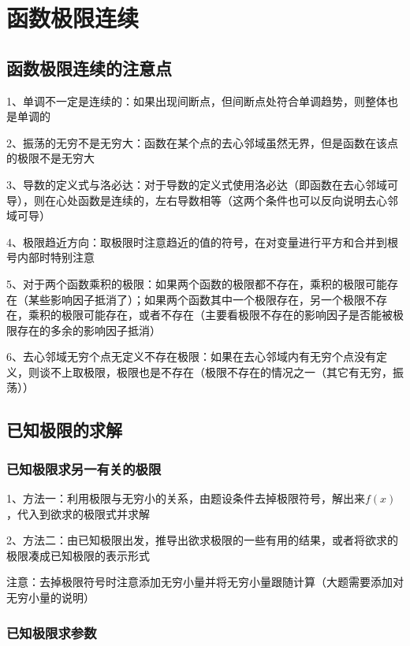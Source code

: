 \chapter{函数极限连续}

\section{函数极限连续的注意点}

1、单调不一定是连续的：如果出现间断点，但间断点处符合单调趋势，则整体也是单调的

2、振荡的无穷不是无穷大：函数在某个点的去心邻域虽然无界，但是函数在该点的极限不是无穷大

3、导数的定义式与洛必达：对于导数的定义式使用洛必达（即函数在去心邻域可导），则在心处函数是连续的，左右导数相等（这两个条件也可以反向说明去心邻域可导）

4、极限趋近方向：取极限时注意趋近的值的符号，在对变量进行平方和合并到根号内部时特别注意

5、对于两个函数乘积的极限：如果两个函数的极限都不存在，乘积的极限可能存在（某些影响因子抵消了）；如果两个函数其中一个极限存在，另一个极限不存在，乘积的极限可能存在，或者不存在（主要看极限不存在的影响因子是否能被极限存在的多余的影响因子抵消）

6、去心邻域无穷个点无定义不存在极限：如果在去心邻域内有无穷个点没有定义，则谈不上取极限，极限也是不存在（极限不存在的情况之一（其它有无穷，振荡））

\section{已知极限的求解}



\subsection{已知极限求另一有关的极限}

1、方法一：利用极限与无穷小的关系，由题设条件去掉极限符号，解出来$f(x)$，代入到欲求的极限式并求解

2、方法二：由已知极限出发，推导出欲求极限的一些有用的结果，或者将欲求的极限凑成已知极限的表示形式

注意：去掉极限符号时注意添加无穷小量并将无穷小量跟随计算（大题需要添加对无穷小量的说明）



\subsection{已知极限求参数}

